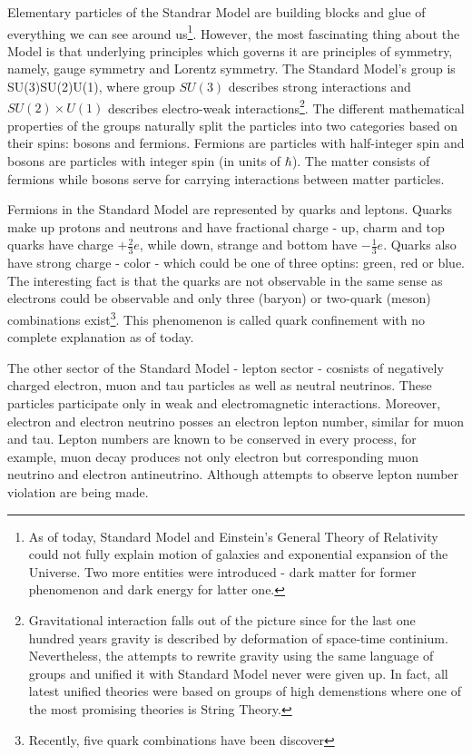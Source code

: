 Elementary particles of the Standrar Model are building blocks and glue of everything we
can see around us\footnote{As of today, Standard Model and Einstein's General Theory of 
Relativity could not fully explain motion of galaxies and exponential expansion of the Universe. 
Two more entities were introduced - dark matter for former phenomenon and dark energy 
for latter one.}. However, the most fascinating thing about the Model is that underlying 
principles which governs it are principles of symmetry, namely, gauge symmetry and Lorentz 
symmetry. The Standard Model's group is 
\be
SU(3)\times SU(2)\times U(1),
\ee 
where group $SU(3)$ describes strong interactions and $SU(2)\times U(1)$ describes 
electro-weak interactions\footnote{Gravitational interaction falls out of the picture
since for the last one hundred years gravity is described by deformation of space-time 
continium. Nevertheless, the attempts to rewrite gravity using the same language of groups
and unified it with Standard Model never were given up. In fact, all latest unified theories 
were based on groups of high demenstions where one of the most promising theories is 
String Theory.}. The different mathematical properties of the groups naturally split
the particles into two categories based on their spins: bosons and fermions. Fermions are 
particles with half-integer spin and bosons are particles with integer spin (in units of $\hbar$). 
The matter consists of fermions while bosons serve for carrying interactions between matter particles.

Fermions in the Standard Model are represented by quarks and leptons. Quarks make up protons
and neutrons and have fractional charge - up, charm and top quarks have charge $+\frac{2}{3}e$, 
while down, strange and bottom have $-\frac{1}{3}e$. Quarks also have strong charge - color -
which could be one of three optins: green, red or blue. The interesting fact is that the quarks
are not observable in the same sense as electrons could be observable and only three (baryon) or 
two-quark (meson) combinations exist\footnote{Recently, five quark combinations have been discover}. 
This phenomenon is called quark confinement with no complete explanation as of today. 

The other sector of the Standard Model - lepton sector - cosnists of negatively charged electron,
muon and tau particles as well as neutral neutrinos. These particles participate only in
weak and electromagnetic interactions. Moreover, electron and electron neutrino posses an electron 
lepton number, similar for muon and tau. Lepton numbers are known to be conserved in every process,
for example, muon decay produces not only electron but corresponding muon neutrino and 
electron antineutrino. Although attempts to observe lepton number violation are being made.


